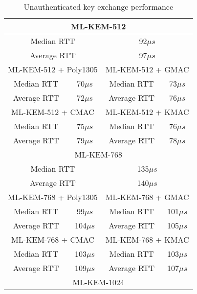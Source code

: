 \documentclass[floatrow,journal=tches,submission]{iacrtrans}
\newcommand{\us}{\mu s}
\begin{document}
\begin{table}[H]
    \caption{Unauthenticated key exchange performance}\label{tbl:unauthenticated-kex}
    \begin{tabular}{|c|c|c|c|}
        \hline
        \multicolumn{4}{|c|}{ML-KEM-512} \\
        \hline
        \multicolumn{2}{|c|}{Median RTT}
        & \multicolumn{2}{|c|}{92$\us$} \\
        \hline
        \multicolumn{2}{|c|}{Average RTT}
        & \multicolumn{2}{|c|}{97$\us$} \\
        \hline\hline
        \multicolumn{2}{|c|}{ML-KEM-512 + Poly1305}
        & \multicolumn{2}{|c|}{ML-KEM-512 + GMAC} \\
        \hline
        Median RTT & 70$\us$ & Median RTT & 73$\us$ \\
        \hline
        Average RTT & 72$\us$ & Average RTT & 76$\us$ \\
        \hline\hline
        \multicolumn{2}{|c|}{ML-KEM-512 + CMAC}
        & \multicolumn{2}{|c|}{ML-KEM-512 + KMAC} \\
        \hline
        Median RTT & 75$\us$ & Median RTT & 76$\us$ \\
        \hline
        Average RTT & 79$\us$ & Average RTT & 78$\us$ \\
        \hline
        \multicolumn{4}{|c|}{ML-KEM-768} \\
        \hline
        \multicolumn{2}{|c|}{Median RTT}
        & \multicolumn{2}{|c|}{135$\us$} \\
        \hline
        \multicolumn{2}{|c|}{Average RTT}
        & \multicolumn{2}{|c|}{140$\us$} \\
        \hline\hline
        \multicolumn{2}{|c|}{ML-KEM-768 + Poly1305}
        & \multicolumn{2}{|c|}{ML-KEM-768 + GMAC} \\
        \hline
        Median RTT & 99$\us$ & Median RTT & 101$\us$ \\
        \hline
        Average RTT & 104$\us$ & Average RTT & 105$\us$ \\
        \hline\hline
        \multicolumn{2}{|c|}{ML-KEM-768 + CMAC}
        & \multicolumn{2}{|c|}{ML-KEM-768 + KMAC} \\
        \hline
        Median RTT & 103$\us$ & Median RTT & 103$\us$ \\
        \hline
        Average RTT & 109$\us$ & Average RTT & 107$\us$ \\
        \hline
        \multicolumn{4}{|c|}{ML-KEM-1024} \\

\end{tabular}
\end{table}
\end{document}
